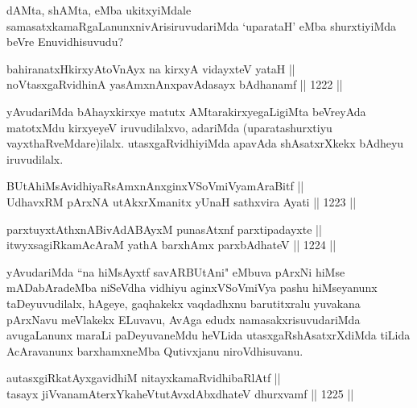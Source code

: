 \begin{artha}
dAMta, shAMta, eMba ukitxyiMdale samasatxkamaRgaLanunx\break nivArisiruvudariMda `uparataH' eMba shurxtiyiMda beVre Enu\break vidhisuvudu?
\end{artha}

\begin{shl}
bahiranatxHkirxyAtoV\s nAyx na kirxyA vidayxteV yataH || \\
noVtasxgaRvidhinA yasAmxnAnxpavAdasayx bAdhanamf \hfill || 1222 ||  
\end{shl}

\begin{artha}
yAvudariMda bAhayxkirxye matutx AMtarakirxyegaLigiMta beVreyAda matotxMdu kirxyeyeV iruvudilalxvo, adariMda (uparatashurxtiyu vayxthaRveMdare)ilalx. utasxgaRvidhiyiMda apavAda shAsatxrXkekx bAdheyu iruvudilalx.
\end{artha}


\begin{shl}
BUtAhiMsAvidhiyaRsAmxnAnxginxVSoVmiVyamAraBitf || \\
UdhavxRM pArxNA utAkxrXmanitx yUnaH sathxvira Ayati \hfill || 1223 ||  
\end{shl}

\begin{shl}
parxtuyxtAthxnABivAdABAyxM punasAtxnf parxtipadayxte || \\
itwyxsagiRkamAcAraM yathA barxhAmx parxbAdhateV \hfill || 1224 ||  
\end{shl}

\begin{artha}
yAvudariMda ``na hiMsAyxtf savARBUtAni" eMbuva pArxNi hiMse mADabAradeMba niSeVdha vidhiyu aginxVSoVmiVya pashu hiMseyanunx taDeyuvudilalx, hAgeye, gaqhakekx vaqdadhxnu barutitxralu yuvakana pArxNavu meVlakekx ELuvavu, AvAga edudx namasakxrisuvudariMda avugaLanunx maraLi paDeyuvaneMdu heVLida utasxgaRshAsatxrXdiMda tiLida AcAravanunx barxhamxneMba Qutivxjanu niroVdhisuvanu.
\end{artha}


\begin{shl}
autasxgiRkatAyxgavidhiM nitayxkamaRvidhibaRlAtf || \\
tasayx jiVvanamAterxYkaheVtutAvxdAbxdhateV dhurxvamf \hfill || 1225 ||  
\end{shl}


